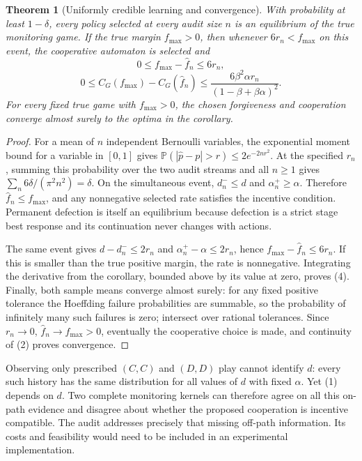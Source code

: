 \documentclass[11pt,a4paper]{article}
\newtheorem{theorem}{Theorem}[section]
\theoremstyle{remark}
\newcommand{\Prob}{\mathbb P}
\begin{document}
\begin{theorem}[Uniformly credible learning and convergence]
With probability at least $1-\delta$, every policy selected at every audit size $n$ is an equilibrium of the true monitoring game. If the true margin $f_{\max}>0$, then whenever $6r_n<f_{\max}$ on this event, the cooperative automaton is selected and
\[
 0\le f_{\max}-\widehat f_n\le6r_n,
\]
\[
 0\le C_G(f_{\max})-C_G(\widehat f_n)
 \le\frac{6\beta^2\alpha r_n}{(1-\beta+\beta\alpha)^2}. \tag{4}
\]
For every fixed true game with $f_{\max}>0$, the chosen forgiveness and cooperation converge almost surely to the optima in the corollary.
\end{theorem}
\begin{proof}
For a mean of $n$ independent Bernoulli variables, the exponential moment bound for a variable in $[0,1]$ gives
$\Prob(|\widehat p-p|>r)\le2e^{-2nr^2}$.
At the specified $r_n$, summing this probability over the two audit streams and all $n\ge1$ gives
$\sum_n6\delta/(\pi^2n^2)=\delta$.
On the simultaneous event, $d_n^-\le d$ and $\alpha_n^+\ge\alpha$. Therefore $\widehat f_n\le f_{\max}$, and any nonnegative selected rate satisfies the incentive condition. Permanent defection is itself an equilibrium because defection is a strict stage best response and its continuation never changes with actions.

The same event gives $d-d_n^-\le2r_n$ and $\alpha_n^+-\alpha\le2r_n$, hence $f_{\max}-\widehat f_n\le6r_n$. If this is smaller than the true positive margin, the rate is nonnegative. Integrating the derivative from the corollary, bounded above by its value at zero, proves (4). Finally, both sample means converge almost surely: for any fixed positive tolerance the Hoeffding failure probabilities are summable, so the probability of infinitely many such failures is zero; intersect over rational tolerances. Since $r_n\to0$, $\widehat f_n\to f_{\max}>0$, eventually the cooperative choice is made, and continuity of (2) proves convergence.
\end{proof}
Observing only prescribed $(C,C)$ and $(D,D)$ play cannot identify $d$: every such history has the same distribution for all values of $d$ with fixed $\alpha$. Yet (1) depends on $d$. Two complete monitoring kernels can therefore agree on all this on-path evidence and disagree about whether the proposed cooperation is incentive compatible. The audit addresses precisely that missing off-path information. Its costs and feasibility would need to be included in an experimental implementation.
\end{document}
